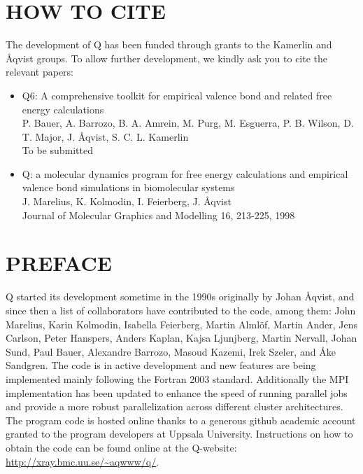 \documentclass[a4paper,11pt]{article}
\begin{document}
\section{HOW TO CITE}
The development of Q has been funded through grants to the Kamerlin and {\AA}qvist groups.
To allow further development, we kindly ask you to cite the relevant papers:
\begin{itemize}
	\item{Q6: A comprehensive toolkit for empirical valence bond and related free energy calculations\\
		P. Bauer, A. Barrozo, B. A. Amrein, M. Purg, M. Esguerra, P. B. Wilson, D. T. Major, J. {\AA}qvist, S. C. L. Kamerlin\\
		To be submitted}
	\item{Q: a molecular dynamics program for free energy calculations and empirical valence bond simulations in biomolecular systems\\
		J. Marelius, K. Kolmodin, I. Feierberg, J. {\AA}qvist\\
		Journal of Molecular Graphics and Modelling 16, 213-225, 1998}
\end{itemize}
\section{PREFACE}
Q started its development sometime in the 1990s originally
by  Johan \AA  qvist,  and since  then a  list  of collaborators  have
contributed to  the code, among  them: John Marelius,  Karin Kolmodin,
Isabella Feierberg, Martin Alml\"of, Martin Ander, Jens Carlson, Peter
Hanspers, Anders Kaplan, Kajsa  Ljunjberg, Martin Nervall, Johan Sund,
Paul Bauer, Alexandre Barrozo, Masoud  Kazemi, Irek Szeler, and \AA ke
Sandgren.   The code  is in  active development  and new  features are
being  implemented  mainly  following   the  Fortran  2003  standard.
Additionally the  MPI implementation has  been updated to  enhance the
speed   of  running   parallel  jobs   and  provide   a  more   robust
parallelization across  different cluster architectures.   The program
code is  hosted online  thanks to a  generous github  academic account
granted to the program developers at Uppsala University.  Instructions
on  how to  obtain the  code  can be  found online  at the  Q-website:
\url{http://xray.bmc.uu.se/~aqwww/q/}.
\end{document}
